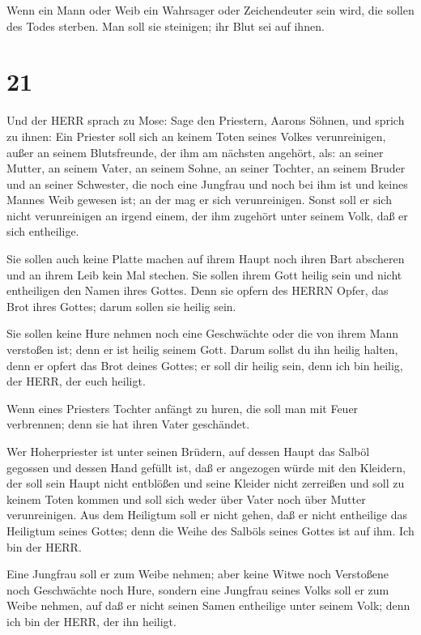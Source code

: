  Wenn ein Mann oder Weib ein Wahrsager oder Zeichendeuter
sein wird, die sollen des Todes sterben. Man soll sie steinigen; ihr
Blut sei auf ihnen.

\hypertarget{section-20}{%
\section{21}\label{section-20}}

 Und der HERR sprach zu Mose: Sage den Priestern, Aarons
Söhnen, und sprich zu ihnen: Ein Priester soll sich an keinem Toten
seines Volkes verunreinigen,  außer an seinem Blutsfreunde,
der ihm am nächsten angehört, als: an seiner Mutter, an seinem Vater, an
seinem Sohne, an seiner Tochter, an seinem Bruder  und an
seiner Schwester, die noch eine Jungfrau und noch bei ihm ist und keines
Mannes Weib gewesen ist; an der mag er sich verunreinigen. 
Sonst soll er sich nicht verunreinigen an irgend einem, der ihm zugehört
unter seinem Volk, daß er sich entheilige.

 Sie sollen auch keine Platte machen auf ihrem Haupt noch
ihren Bart abscheren und an ihrem Leib kein Mal stechen. 
Sie sollen ihrem Gott heilig sein und nicht entheiligen den Namen ihres
Gottes. Denn sie opfern des HERRN Opfer, das Brot ihres Gottes; darum
sollen sie heilig sein.

 Sie sollen keine Hure nehmen noch eine Geschwächte oder die
von ihrem Mann verstoßen ist; denn er ist heilig seinem Gott.
 Darum sollst du ihn heilig halten, denn er opfert das Brot
deines Gottes; er soll dir heilig sein, denn ich bin heilig, der HERR,
der euch heiligt.

 Wenn eines Priesters Tochter anfängt zu huren, die soll man
mit Feuer verbrennen; denn sie hat ihren Vater geschändet.

 Wer Hoherpriester ist unter seinen Brüdern, auf dessen
Haupt das Salböl gegossen und dessen Hand gefüllt ist, daß er angezogen
würde mit den Kleidern, der soll sein Haupt nicht entblößen und seine
Kleider nicht zerreißen  und soll zu keinem Toten kommen
und soll sich weder über Vater noch über Mutter verunreinigen.
 Aus dem Heiligtum soll er nicht gehen, daß er nicht
entheilige das Heiligtum seines Gottes; denn die Weihe des Salböls
seines Gottes ist auf ihm. Ich bin der HERR.

 Eine Jungfrau soll er zum Weibe nehmen;  aber
keine Witwe noch Verstoßene noch Geschwächte noch Hure, sondern eine
Jungfrau seines Volks soll er zum Weibe nehmen,  auf daß er
nicht seinen Samen entheilige unter seinem Volk; denn ich bin der HERR,
der ihn heiligt.

